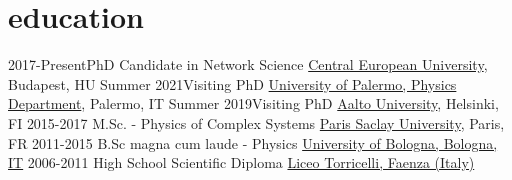 \documentclass[]{cv-style}     %
\begin{document}
\section{education}
\begin{entrylist}
\entry
{2017-Present}{PhD Candidate in Network Science}
{\href{http://www.ceu.edu}{Central European University}, Budapest, HU}
{}%
\entry
{Summer 2021}{Visiting PhD}
{\href{https://www.unipa.it}{University of Palermo, Physics Department}, Palermo, IT}
{}%
\entry
{Summer 2019}{Visiting PhD}
{\href{https://www.aalto.fi}{Aalto University}, Helsinki, FI}
{}%
\entry
{2015-2017}
{M.Sc. - Physics of Complex Systems%
}
{%
\href{https://www.universite-paris-saclay.fr/en}{Paris Saclay University}, Paris, FR
}{}
\entry
{2011-2015}
{B.Sc magna cum laude - Physics}
{\href{http://http://www.unibo.it/en}{University of Bologna, Bologna, IT}}{}
\entry
{2006-2011}
{High School Scientific Diploma}
{\href{http://www.liceotorricelli.it/}{Liceo Torricelli, Faenza (Italy)}}
{}%
\end{entrylist}

\pagebreak

\end{document}
